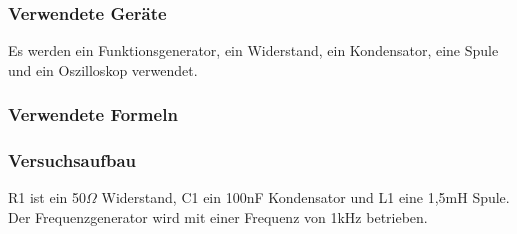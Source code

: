 \documentclass[12pt,a4paper]{article}
\begin{document}
\subsubsection{Verwendete Geräte}

Es werden ein Funktionsgenerator, ein Widerstand, ein Kondensator, eine Spule und ein Oszilloskop verwendet.

\subsubsection{Verwendete Formeln}
\subsubsection{Versuchsaufbau}

R1 ist ein 50$\Omega$ Widerstand, C1 ein 100nF Kondensator und L1 eine 1,5mH Spule. Der Frequenzgenerator wird mit einer Frequenz von 1kHz betrieben.
\end{document}
